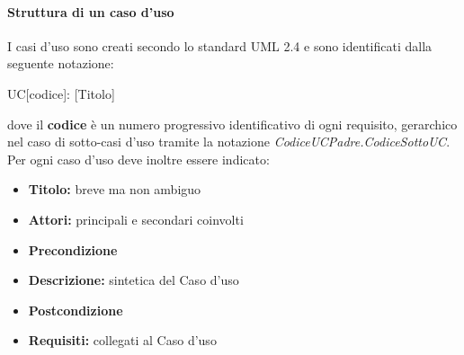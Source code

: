 \documentclass[12pt,a4paper]{article}
\begin{document}
\paragraph{Struttura di un caso d'uso}
I casi d'uso sono creati secondo lo standard UML 2.4 e sono identificati dalla seguente notazione:
\begin{center}
	UC[codice]: [Titolo]
\end{center}
dove il \textbf{codice} è un numero progressivo identificativo di ogni requisito, gerarchico nel  caso di sotto-casi d'uso tramite la notazione \textit{CodiceUCPadre.CodiceSottoUC}. Per ogni caso d'uso deve inoltre essere indicato:
\begin{itemize}
	\item \textbf{Titolo:} breve ma non ambiguo
	\item \textbf{Attori:} principali e secondari coinvolti
	\item \textbf{Precondizione}
	\item \textbf{Descrizione:} sintetica del Caso d'uso
	\item \textbf{Postcondizione}
	\item \textbf{Requisiti:} collegati al Caso d'uso
\end{itemize}
\end{document}
